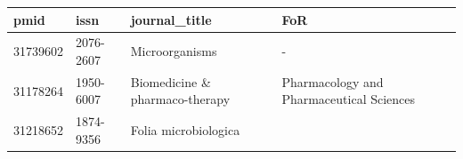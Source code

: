 \documentclass[
]{article}
\begin{document}
\begin{longtable}[]{@{}llll@{}}
\toprule
\begin{minipage}[b]{0.22\columnwidth}\raggedright
pmid\strut
\end{minipage} & \begin{minipage}[b]{0.22\columnwidth}\raggedright
issn\strut
\end{minipage} & \begin{minipage}[b]{0.22\columnwidth}\raggedright
journal\_title\strut
\end{minipage} & \begin{minipage}[b]{0.22\columnwidth}\raggedright
FoR\strut
\end{minipage}\tabularnewline
\midrule
\endhead
\begin{minipage}[t]{0.22\columnwidth}\raggedright
31739602\strut
\end{minipage} & \begin{minipage}[t]{0.22\columnwidth}\raggedright
2076-2607\strut
\end{minipage} & \begin{minipage}[t]{0.22\columnwidth}\raggedright
Microorganisms\strut
\end{minipage} & \begin{minipage}[t]{0.22\columnwidth}\raggedright
-\strut
\end{minipage}\tabularnewline
\begin{minipage}[t]{0.22\columnwidth}\raggedright
31178264\strut
\end{minipage} & \begin{minipage}[t]{0.22\columnwidth}\raggedright
1950-6007\strut
\end{minipage} & \begin{minipage}[t]{0.22\columnwidth}\raggedright
Biomedicine \& pharmaco-therapy\strut
\end{minipage} & \begin{minipage}[t]{0.22\columnwidth}\raggedright
Pharmacology and Pharmaceutical Sciences\strut
\end{minipage}\tabularnewline
\begin{minipage}[t]{0.22\columnwidth}\raggedright
31218652\strut
\end{minipage} & \begin{minipage}[t]{0.22\columnwidth}\raggedright
1874-9356\strut
\end{minipage} & \begin{minipage}[t]{0.22\columnwidth}\raggedright
Folia microbiologica\strut
\end{minipage} & \begin{minipage}[t]{0.22\columnwidth}\raggedright

\end{minipage}
\end{longtable}
\end{document}
